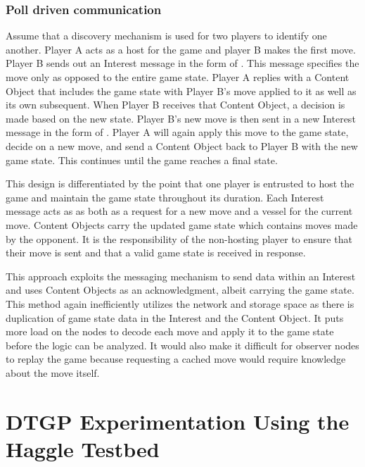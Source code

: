 \documentclass[a4paper,12pt]{report}      %
\begin{document}
\subsection{Poll driven communication}

Assume that a discovery mechanism is used for two players to identify one another. Player A acts as a
host for the game and player B makes the first move. Player B sends out an Interest message in the
form of \texttt{}. This message specifies the move only 
as opposed to the entire game state. Player A replies with a Content Object that includes the game state
with Player B's move applied to it as well as its own subsequent. When Player B
receives that Content Object, a decision is made based on the new state. Player B's new move is then sent 
in a new Interest message in the form of \texttt{}. 
Player A will again apply this move to the game state, decide on a new move, and send a Content
Object back to Player B with the new game state. This continues until the game reaches a final state.

This design is differentiated by the point that one player is entrusted to host the game and maintain the
game state throughout its duration. Each Interest message acts as as both as a request for a new move
and a vessel for the current move. Content Objects carry the updated game state which contains moves
made by the opponent. It is the responsibility of the non-hosting player to ensure that their move is sent
and that a valid game state is received in response.

This approach exploits the messaging mechanism to send data within an Interest and uses Content Objects
as an acknowledgment, albeit carrying the game state. This method again inefficiently utilizes the network and storage space
 as there is duplication of game state data in the Interest and the Content Object. It puts more load on the nodes
to decode each move and apply it to the game state before the logic can be analyzed. It would also make it difficult
for observer nodes to replay the game because requesting a cached move would require knowledge about the move itself.

\pagebreak
\chapter{DTGP Experimentation Using the Haggle Testbed}
\end{document}
